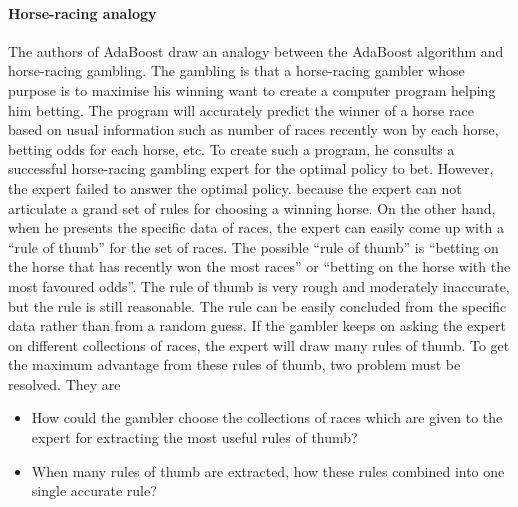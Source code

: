 \paragraph{Horse-racing analogy}
The authors of AdaBoost draw an analogy between the AdaBoost algorithm and horse-racing gambling\cite{Freund1995,Freund1999,Schapire1999}. The gambling is that a horse-racing gambler whose purpose is to maximise his winning want to create a computer program helping him betting. The program will accurately predict the winner of a horse race based on usual information such as number of races recently won by each horse, betting odds for each horse, etc. To create such a program, he consults a successful horse-racing gambling expert for the optimal policy to bet. However, the expert failed to answer the optimal policy. because the expert can not articulate a grand set of rules for choosing a winning horse. On the other hand, when he presents the specific data of races, the expert can easily come up with a ``rule of thumb'' for the set of races. The possible ``rule of thumb'' is ``betting on the horse that has recently won the most races'' or ``betting on the horse with the most favoured odds''. The rule of thumb is very rough and moderately inaccurate, but the rule is still reasonable. The rule can be easily concluded from the specific data rather than from a random guess. If the gambler keeps on asking the expert on different collections of races, the expert will draw many rules of thumb. To get the maximum advantage from these rules of thumb, two problem must be resolved. They are
\begin{itemize}
 \item How could the gambler choose the collections of races which are given to the expert for extracting the most useful rules of thumb?
 \item  When many rules of thumb are extracted, how these rules combined into one single accurate rule?
\end{itemize}

